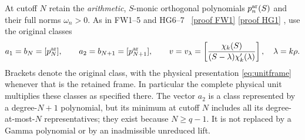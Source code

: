 \documentclass[11pt]{article}
\begin{document}
At cutoff $N$ retain the \emph{arithmetic}, $S$-monic orthogonal
polynomials $p_n^{\rm ar}(S)$ and their full norms $\omega_n>0$.
As in FW1--5 and HG6--7 \cite{FW,HG}%
~\href{https://github.com/KokunoYumeto/zeta-function-research-reader/blob/5992ad50c0f2a06921f1fcaded7b4e38097c0739/workbenches/splitzero-tandem/continuations/20260920-original-kernel-mixed-determinants/providers/FULL_WINDOW_SOURCE_PRODUCTS.tex\#L28}{[proof FW1]} \href{https://github.com/KokunoYumeto/zeta-function-research-reader/blob/5992ad50c0f2a06921f1fcaded7b4e38097c0739/workbenches/splitzero-tandem/continuations/20260920-original-kernel-mixed-determinants/providers/HEAT_GROWTH_AND_ORIGINAL_CURRENTS.tex\#L31}{[proof HG1]}%
{}, use the original classes
\begin{equation}\label{eq:nativetriple}
 a_1=b_N=[p_N^{\rm ar}],\qquad
 a_2=b_{N+1}=[p_{N+1}^{\rm ar}],\qquad
 v=v_\lambda=\left[\frac{\chi_k(S)}{(S-\lambda)\chi_k'(\lambda)}\right],
 \quad\lambda=k\rho.
\end{equation}
Brackets denote the original class, with the physical presentation
\eqref{eq:unitframe} whenever that is the retained frame.  In particular
the complete physical unit multiplies these classes as specified there.
The vector $a_2$ is a class represented by a degree-$N+1$ polynomial,
but its minimum at cutoff $N$ includes all its degree-at-most-$N$
representatives; they exist because $N\ge q-1$.  It is not replaced
by a Gamma polynomial or by an inadmissible unreduced lift.
\end{document}
